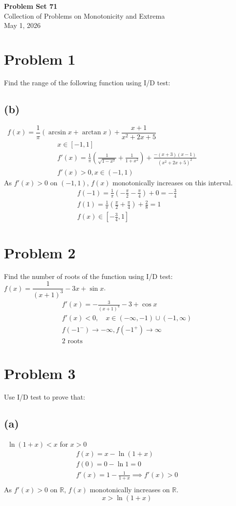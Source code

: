 \documentclass[12pt]{article}
\newcommand{\vem}{\vspace{0.5em}}
\newcommand{\problem}[1]{\section{Problem #1}}
\newcommand{\subproblem}[1]{\subsection{(#1)} \,}
\begin{document}
\vspace*{0cm}

\begin{center}
    {\Large \bfseries Problem Set 71} \\[0.5cm]
    {\large Collection of Problems on Monotonicity and Extrema} \\[0.35cm]
    {\normalsize May 1, 2026}
\end{center}


\problem{1}
Find the range of the following function using I/D test: \vem

\subproblem{b} $f(x)=\dfrac{1}{\pi}(\arcsin x+\arctan x)+\dfrac{x+1}{x^2+2x+5}$
\begin{gather*}
    x\in [-1,1]\\
    f'(x)=\frac{1}{\pi}(\frac{1}{\sqrt{1-x^2}}+\frac{1}{1+x^2})+\frac{-(x+3)(x-1)}{(x^2+2x+5)^2}\\
    f'(x)>0, x\in (-1,1)
\end{gather*}
As $f'(x)>0$ on $(-1,1)$, $f(x)$ monotonically increases on this interval.
\begin{gather*}
    f(-1)=\frac{1}{\pi}(-\frac{\pi}{2}-\frac{\pi}{4})+0=-\frac{3}{4}\\
    f(1)=\frac{1}{\pi}(\frac{\pi}{2}+\frac{\pi}{4})+\frac{2}{8}=1\\
    \boxed{f(x)\in [-\frac{3}{4},1]}
\end{gather*}

\problem{2}
Find the number of roots of the function using I/D test: $f(x)=\dfrac{1}{(x+1)^3}-3x+\sin x$.
\begin{gather*}
    f'(x)=-\frac{3}{(x+1)^4}-3+\cos x\\
    f'(x)<0, \quad x\in (-\infty,-1) \cup (-1,\infty)\\
    f(-1^-)\to -\infty, f(-1^+)\to \infty\\
    \boxed{2  \text{ roots}}
\end{gather*}

\problem{3}
Use I/D test to prove that:\vem

\subproblem{a}
$\ln (1+x)<x$ for $x>0$
\begin{gather*}
    f(x)=x-\ln(1+x)\\
    f(0)=0-\ln 1=0\\
    f'(x)=1-\frac{1}{1+x} \implies f'(x)>0\\
\end{gather*}
As $f'(x)>0$ on $\mathbb{R}$, $f(x)$ monotonically increases on $\mathbb{R}$.
\[
\boxed{x>\ln (1+x)}
\]
\end{document}
